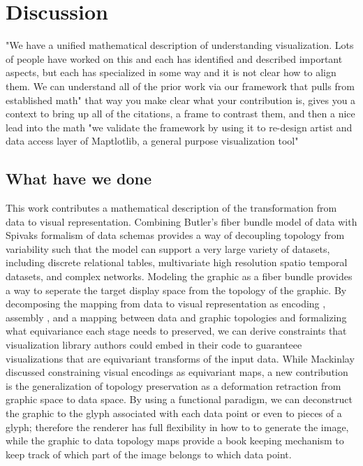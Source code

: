 \documentclass[../main.tex]{subfiles}
\begin{document}
\section{Discussion}

"We have a unified mathematical description of understanding visualization.  Lots of people have worked on this and each has identified and described important aspects, but each has specialized in some way and it is not clear how to align them.  We can understand all of the prior work via our framework that pulls from {established math}"
that way you make clear what your contribution is, gives you a context to bring up all of the citations, a frame to contrast them, and then a nice lead into the math
 "we validate the framework by using it to re-design artist and data access layer of Maptlotlib, a general purpose visualization tool"

\subsection{What have we done}
This work contributes a mathematical description of the transformation from data to visual representation. Combining Butler's fiber bundle model of data with Spivaks formalism of data schemas provides a way of decoupling topology from variability such that the model can support a very large variety of datasets, including discrete relational tables, multivariate high resolution spatio temporal datasets, and complex networks. Modeling the graphic as a fiber bundle provides a way to seperate the target display space from the topology of the graphic. By decomposing the mapping from data to visual representation as encoding \vchannel, assembly \vmark, and a mapping between data and graphic topologies \vindex and formalizing what equivariance each stage needs to preserved, we can derive constraints that visualization library authors could embed in their code to guaranteee visualizations that are equivariant transforms of the input data. While Mackinlay discussed constraining visual encodings as equivariant maps, a new contribution is the generalization of topology preservation as a deformation retraction from graphic space to data space. By using a functional paradigm, we can deconstruct the graphic to the glyph associated with each data point or even to pieces of a glyph; therefore the renderer has full  flexibility in how to to generate the image, while the graphic to data topology maps provide a book keeping mechanism to keep track of which part of the image belongs to which data point. 
\end{document}
